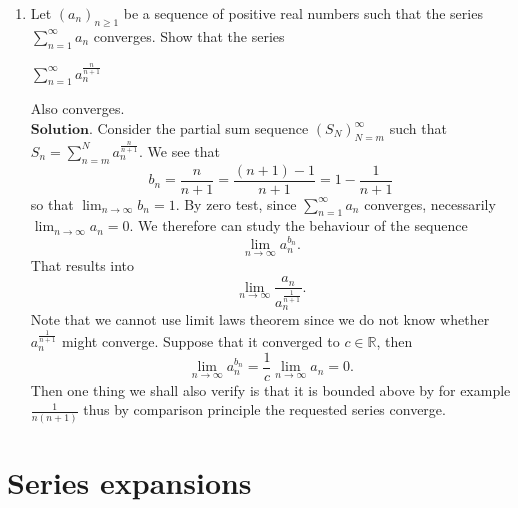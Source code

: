 \documentclass{article}
\theoremstyle{remark}
\begin{document}
\begin{enumerate}
    \item Let $(a_n)_{n\geq 1}$ be a sequence of positive real numbers such that
    the series $\sum_{n=1}^{\infty}a_n$ converges. Show that the series
    \begin{center}
        $\displaystyle \sum_{n=1}^{\infty}a_n^{\frac{n}{n+1}}$
    \end{center}
    Also converges.\\
    $\textbf{Solution.}$
    Consider the partial sum sequence $(S_N)_{N=m}^{\infty}$ such that $S_n = \sum_{n=m}^{N}a_n^{\frac{n}{n+1}}$.
    We see that 
    \[
    b_n = \frac{n}{n+1} = \frac{(n+1)-1}{n+1} = 1 - \frac{1}{n+1}
    \]
    so that $\lim_{n\to\infty}b_n = 1$.
    By zero test, since $\sum_{n=1}^{\infty}a_n$ converges, necessarily $\lim_{n\to\infty}a_n = 0$.
    We therefore can study the behaviour of the sequence
    \[
    \lim_{n\to\infty} a_n^{b_n}.
    \]
    That results into 
    \[
    \lim_{n\to\infty} \frac{a_n}{a_n^{\frac{1}{n+1}}}.
    \]
    Note that we cannot use limit laws theorem since we do not know whether $a_n^{\frac{1}{n+1}}$ might converge.
    Suppose that it converged to $c \in \mathbb{R}$, then
    \[
    \lim_{n\to\infty}a_n^{b_n} = \frac{1}{c}\lim_{n\to\infty}a_n = 0.
    \]
    Then one thing we shall also verify is that it is bounded above by for example $\frac{1}{n(n+1)}$ thus 
    by comparison principle the requested series converge.



\end{enumerate}
\section*{Series expansions}
\end{document}
